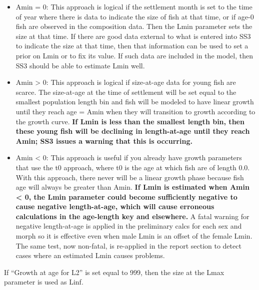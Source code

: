 \begin{itemize}
	\item Amin = 0: This approach is logical if the settlement month is set to the time of year where there is data to indicate the size of fish at that time, or if age-0 fish are observed in the composition data. Then the Lmin parameter sets the size at that time. If there are good data external to what is entered into SS3 to indicate the size at that time, then that information can be used to set a prior on Lmin or to fix its value. If such data are included in the model, then SS3 should be able to estimate Lmin well.
	\item Amin > 0: This approach is logical if size-at-age data for young fish are scarce. The size-at-age at the time of settlement will be set equal to the smallest population length bin and fish will be modeled to have linear growth until they reach age = Amin when they will transition to growth according to the growth curve. \textbf{If Lmin is less than the smallest length bin, then these young fish will be declining in length-at-age until they reach Amin; SS3 issues a warning that this is occurring.}
	\item Amin < 0: This approach is useful if you already have growth parameters that use the t0 approach, where t0 is the age at which fish are of length 0.0. With this approach, there never will be a linear growth phase because fish age will always be greater than Amin. \textbf{If Lmin is estimated when Amin < 0, the Lmin parameter could become sufficiently negative to cause negative length-at-age, which will cause erroneous calculations in the age-length key and elsewhere.} A fatal warning for negative length-at-age is applied in the preliminary calcs for each sex and morph so it is effective even when male Lmin is an offset of the female Lmin. The same test, now non-fatal, is re-applied in the report section to detect cases where an estimated Lmin causes problems. 
\end{itemize}

\hypertarget{AmaxLinf}{}
If “Growth at age for L2” is set equal to 999, then the size at the Lmax parameter is used as Linf.

\hypertarget{ExponentialDecay}{}


